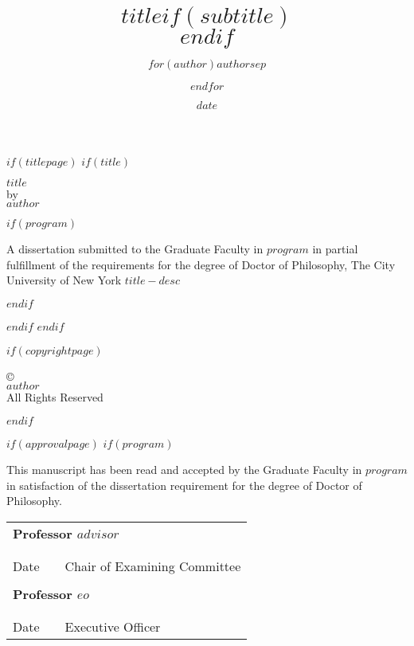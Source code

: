 \documentclass[$if(draft)$$draft$,$endif$$if(fontsize)$$fontsize$,$endif$$if(lang)$$babel-lang$,$endif$$if(papersize)$$papersize$,$endif$$if(sides)$$sides$,$endif$$for(classoption)$$classoption$$sep$,$endfor$]{$documentclass$}
\title{$title$$if(subtitle)$\\\vspace{0.5em}{\large $subtitle$}$endif$}
\author{$for(author)$$author$$sep$ \and $endfor$}
\date{$date$}
\begin{document}

$if(titlepage)$
$if(title)$
\begin{titlepage}
\begin{center}
\vspace{2in}
\textsc{$title$} \\[0.5in]
by \\[0.5in]
\textsc{$author$}\par
\vspace{\fill}
$if(program)$
\begin{raggedright}
A dissertation submitted to the Graduate Faculty in $program$ in partial fulfillment of the requirements for the degree of Doctor of Philosophy, The City University of New York
$title-desc$\\[0.25in]
\end{raggedright}\par
$endif$

\number\year

\end{center}
\end{titlepage}
\setcounter{page}{2}
$endif$
$endif$

$if(copyrightpage)$
\phantom{}\vspace{\fill}
\begin{center}
\copyright\number\year\\
\textsc{$author$}\\
All Rights Reserved\\
\end{center}
$endif$

$if(approvalpage)$
$if(program)$
\newpage
\begin{center}
This manuscript has been read and accepted by the Graduate Faculty in $program$ in satisfaction of the dissertation requirement for the degree of Doctor of Philosophy.
\end{center}

\vspace{0.75in}

\setlength{\tabcolsep}{0pt}
\begin{tabular}{p{1.75in}p{0.5in}p{3.5in}}
\multicolumn{3}{l}{\textbf{Professor $advisor$}}\\
\\
\hrulefill& &\hrulefill \\
Date & & Chair of Examining Committee\\
\\
\multicolumn{3}{l}{\textbf{Professor $eo$}}\\
\\
\hrulefill& &\hrulefill \\
Date & & Executive Officer\\
\end{tabular}
\end{document}
